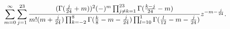 \begin{equation}
\label{eq:sol2largez}
\sum_{m=0}^\infty\sum_{j=1}^{23}{(\Gamma({j\over24}+m))^2(-)^m\prod_{j\neq k=1}^{23}
\Gamma({k-j\over24}-m)\over m!(m+{j\over24})\prod_{k=-2}^8\Gamma
({k\over8}-m-{j\over24})\prod_{l=10}^1\Gamma({l\over12}-m-{j\over24})}z^{-m-{j\over24}}.
\end{equation}

